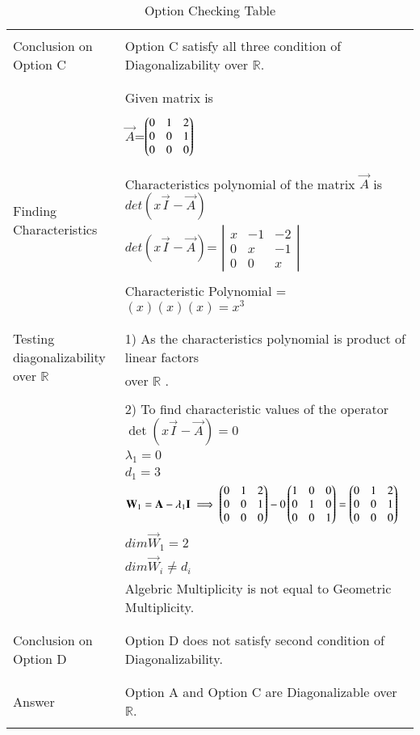 \documentclass[journal,12pt]{IEEEtran}
\begin{document}
\begin{longtable}{|l|l|}
&\\
\hline
\multirow{3}{*}{Conclusion on Option C} & \\
& Option C satisfy all three condition of Diagonalizability over $\mathbb{R}$. \\
&\\
\hline\hline
\newpage
\hline
\multirow{3}{*}{Option D} & \\
& Given matrix is  \\
&\\
& $\vec{A}$=$\begin{pmatrix}0&1&2\\0&0&1\\0&0&0\end{pmatrix}$\\
&\\
\hline
\multirow{3}{*}{Finding Characteristics} & \\
&
Characteristics polynomial of the matrix $\vec{A}$ is $det(x\vec{I}-\vec{A})$\\ 
polynomial
& $det(x\vec{I}-\vec{A})$= $\left|
                \begin{array}{ccc}
                x & -1 & -2\\
                0 & x & -1\\
                0 & 0 & x
                \end{array} \right|$  \\
&\\
& Characteristic Polynomial = $(x)(x)(x)=x^3$\\
&\\
\hline
\multirow{3}{*}{Testing diagonalizability over $\mathbb{R}$} & \\
& 1) As the characteristics  polynomial is product of linear factors\\
&over $\mathbb{R}$ .\\
&\\
&2) To find characteristic values of the operator $\det(x\vec{I}-\vec{A}) = 0$ \\
& $\lambda_1= 0$\\
&$d_1=3$\\
&$\mathbf{W}_1=\mathbf{A}-\lambda_1\mathbf{I}\implies\begin{pmatrix}0&1&2\\0&0&1\\0&0&0\end{pmatrix}-0\begin{pmatrix}1&0&0\\0&1&0\\0&0&1\end{pmatrix}=\begin{pmatrix}0&1&2\\0&0&1\\0&0&0\end{pmatrix}$\\

&$dim \vec{W}_1 = 2$\\
&$dim \vec{W}_i \neq d_i$\\
&Algebric Multiplicity is not equal to Geometric Multiplicity.\\
&\\
\hline
\multirow{3}{*}{Conclusion on Option D} & \\
& Option D  does not satisfy second condition of Diagonalizability.\\
&\\
\hline \hline
\multirow{3}{*}{Answer} & \\
&Option A and Option C are Diagonalizable over $\mathbb{R}$.\\

\hline
\caption{Option Checking Table}
\label{table:2}
\end{longtable}
\end{document}
